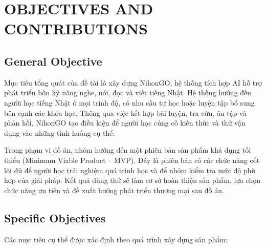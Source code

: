 \section{OBJECTIVES AND CONTRIBUTIONS}

\subsection{General Objective}

Mục tiêu tổng quát của đề tài là xây dựng NihonGO, hệ thống tích hợp AI hỗ trợ phát triển bốn kỹ năng nghe, nói, đọc và viết tiếng Nhật. Hệ thống hướng đến người học tiếng Nhật ở mọi trình độ, có nhu cầu tự học hoặc luyện tập bổ sung bên cạnh các khóa học. Thông qua việc kết hợp bài luyện, tra cứu, ôn tập và phản hồi, NihonGO tạo điều kiện để người học củng cố kiến thức và thử vận dụng vào những tình huống cụ thể.

Trong phạm vi đồ án, nhóm hướng đến một phiên bản sản phẩm khả dụng tối thiểu (Minimum Viable Product -- MVP). Đây là phiên bản có các chức năng cốt lõi đủ để người học trải nghiệm quá trình học và để nhóm kiểm tra mức độ phù hợp của giải pháp. Kết quả dùng thử sẽ làm cơ sở hoàn thiện sản phẩm, lựa chọn chức năng ưu tiên và đề xuất hướng phát triển thương mại sau đồ án.

\subsection{Specific Objectives}

Các mục tiêu cụ thể được xác định theo quá trình xây dựng sản phẩm:

